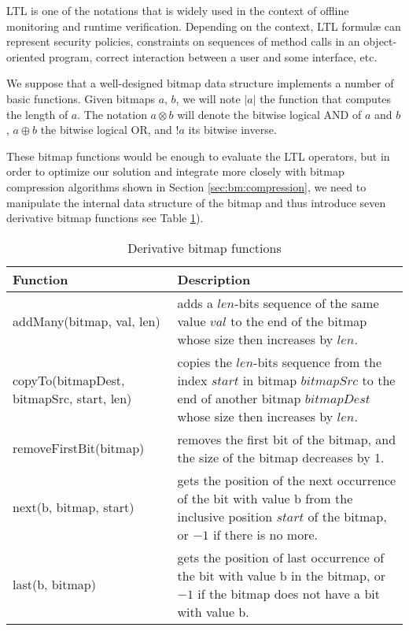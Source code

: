 LTL is one of the notations that is widely used in the context of offline monitoring and runtime verification. Depending on the context, LTL formul\ae{} can represent security policies, constraints on sequences of method calls in an object-oriented program, correct interaction between a user and some interface, etc.

We suppose that a well-designed bitmap data structure implements a number of basic functions. Given bitmaps $a$, $b$, we will note $|a|$ the function that computes the length of $a$. The notation $a \otimes b$ will denote the bitwise logical AND of $a$ and $b$, $a \oplus b$ the bitwise logical OR, and $!a$ its bitwise inverse. %

These bitmap functions would be enough to evaluate the LTL operators, but in order to optimize our solution and integrate more closely with bitmap compression algorithms shown in Section \ref{sec:bm:compression}, we need to manipulate the internal data structure of the bitmap and thus introduce seven derivative bitmap functions see Table \ref{tbl:bm:bmhelpers}).


\begin{table}
\centering
\begin{tabular}{|p{1.5in}|p{3.25in}|}
\hline
Function & Description \\
\hline
addMany(bitmap, val, len) & adds a $len$-bits sequence of the same value $val$ to the end of the bitmap whose size then increases by $len$. \\
\hline
copyTo(bitmapDest, bitmapSrc, start, len) & copies the $len$-bits sequence from the index $start$ in bitmap $bitmapSrc$ to the end of another bitmap $bitmapDest$ whose size then increases by $len$. \\
\hline
removeFirstBit(bitmap) & removes the first bit of the bitmap, and the size of the bitmap decreases by 1. \\
\hline
next(b, bitmap, start) & gets the position of the next occurrence of the bit with value b from the inclusive position $start$ of the bitmap, or $-1$ if there is no more. \\
\hline
last(b, bitmap) & gets the position of last occurrence of the bit with value b in the bitmap, or $-1$ if the bitmap does not have a bit with value b. \\
\hline
\end{tabular}
\caption{Derivative bitmap functions}
\label{tbl:bm:bmhelpers}
\end{table}

